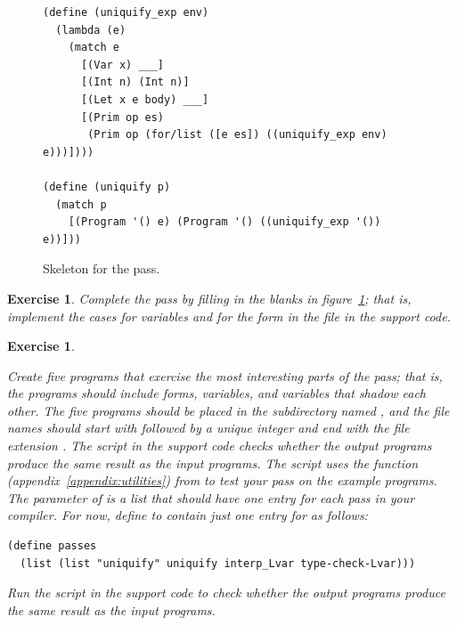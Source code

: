 \documentclass[7x10]{TimesAPriori_MIT}%
\newtheorem{exercise}[theorem]{Exercise}
\numberwithin{theorem}{chapter}
\numberwithin{definition}{chapter}
\numberwithin{equation}{chapter}
\begin{document}
{\begin{figure}[tbp]
\begin{tcolorbox}[colback=white]
\begin{lstlisting}
(define (uniquify_exp env)
  (lambda (e)
    (match e
      [(Var x) ___]
      [(Int n) (Int n)]
      [(Let x e body) ___]
      [(Prim op es)
       (Prim op (for/list ([e es]) ((uniquify_exp env) e)))])))

(define (uniquify p)
  (match p
    [(Program '() e) (Program '() ((uniquify_exp '()) e))]))
\end{lstlisting}
\end{tcolorbox}
\caption{Skeleton for the  pass.}
\label{fig:uniquify-Lvar}
\end{figure}

\begin{exercise}
\normalfont\normalsize %

Complete the  pass by filling in the blanks in
figure~\ref{fig:uniquify-Lvar}; that is, implement the cases for
variables and for the  form in the file 
in the support code.
\end{exercise}

\begin{exercise}
\normalfont\normalsize
\label{ex:Lvar}

Create five \LangVar{} programs that exercise the most interesting
parts of the  pass; that is, the programs should include
 forms, variables, and variables that shadow each other.
The five programs should be placed in the subdirectory named
, and the file names should start with 
followed by a unique integer and end with the file extension
.
%
The  script in the support code checks whether the
output programs produce the same result as the input programs.  The
script uses the  function
(appendix~\ref{appendix:utilities}) from  to test
your  pass on the example programs.  The 
parameter of  is a list that should have one entry
for each pass in your compiler.  For now, define  to
contain just one entry for  as follows:
\begin{lstlisting}
(define passes 
  (list (list "uniquify" uniquify interp_Lvar type-check-Lvar)))
\end{lstlisting}
Run the  script in the support code to check
whether the output programs produce the same result as the input
programs.
\end{exercise}

\fi}
\end{document}
